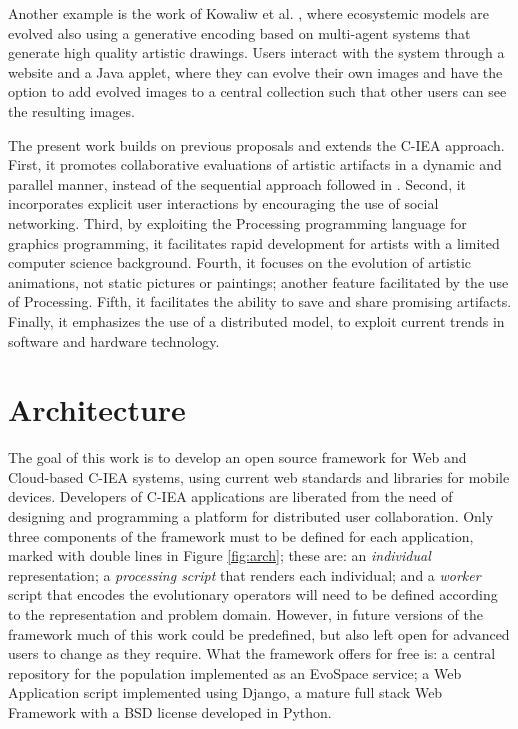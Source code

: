 \documentclass{sig-alternate}
\begin{document}
Another example is the work of Kowaliw et al. \cite{evoeco}, where ecosystemic models are evolved also using a generative encoding based on multi-agent systems
that generate high quality artistic drawings.
Users interact with the system through a website and a Java applet, where they can evolve their own images and have the option
to add evolved images to a central collection such that other users can see the resulting images.


The present work builds on previous proposals and extends the C-IEA approach.
First, it promotes collaborative evaluations of artistic artifacts in a dynamic and parallel manner,
instead of the sequential approach followed in \cite{picbreeder,forms}.
Second, it incorporates explicit user interactions by encouraging the use of social networking.
Third, by exploiting the Processing programming language for graphics programming, it facilitates rapid development for artists
with a limited computer science background.
Fourth, it focuses on the evolution of artistic animations, not static pictures or paintings; another feature facilitated by the use of Processing.
Fifth, it facilitates the ability to save and share promising artifacts.
Finally, it emphasizes the use of a distributed model, to exploit current trends in software and hardware technology.


\section{Architecture}
\label{sec:arq}
The goal of this work is to develop an open source framework for Web and Cloud-based C-IEA systems,
using current web standards and libraries for mobile devices.
Developers of C-IEA applications are liberated from the need of designing and programming a platform for distributed user collaboration.
Only three components of the framework  must to be defined for each application, marked with double lines in Figure \ref{fig:arch}; these are: an \emph{individual} representation; a \emph{processing script} that renders each individual; and a \emph{worker} script that encodes the evolutionary operators will need to be defined according to the representation and problem domain.
However, in future versions of the framework much of this work could be predefined, but also left open for advanced users to change as they require.
What the framework offers for free is: a central repository for the population implemented as an EvoSpace service; a Web Application script implemented using Django, a mature full stack Web Framework with a BSD license developed in Python.
\end{document}
